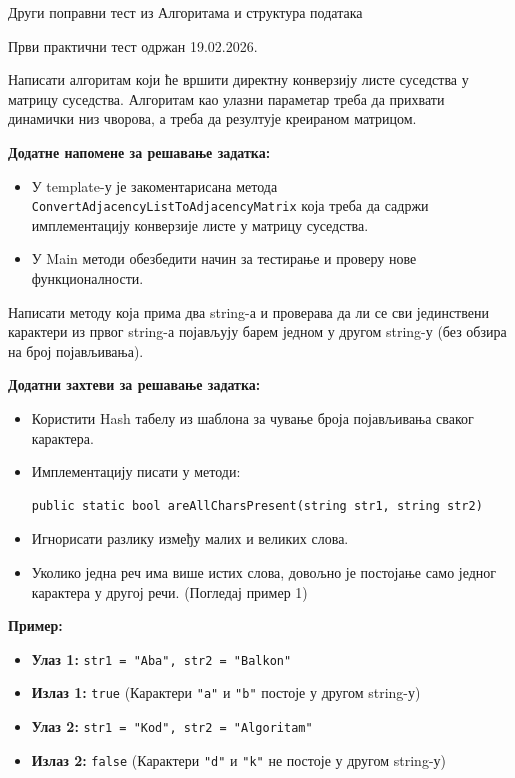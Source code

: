 
Други поправни тест из Алгоритама и структура података

Први практични тест одржан 19.02.2026.

Написати алгоритам који ће вршити директну конверзију листе суседства у матрицу суседства. Алгоритам као улазни параметар треба да прихвати динамички низ чворова, а треба да резултује креираном матрицом.

\textbf{Додатне напомене за решавање задатка:}
\begin{itemize}
	\item У template-у је закоментарисана метода \texttt{ConvertAdjacencyListToAdjacencyMatrix} која треба да садржи имплементацију конверзије листе у матрицу суседства.
	\item У Main методи обезбедити начин за тестирање и проверу нове функционалности.
\end{itemize}

Написати методу која прима два string-а и проверава да ли се сви јединствени карактери из првог string-а појављују барем једном у другом string-у (без обзира на број појављивања).

\textbf{Додатни захтеви за решавање задатка:}
\begin{itemize}
	\item Користити Hash табелу из шаблона за чување броја појављивања сваког карактера.
	\item Имплементацију писати у методи:
	\begin{Verbatim}[fontsize=\small]
public static bool areAllCharsPresent(string str1, string str2)
	\end{Verbatim}
	\item Игнорисати разлику између малих и великих слова.
	\item Уколико једна реч има више истих слова, довољно је постојање само једног карактера у другој речи. (Погледај пример 1)
\end{itemize}

\textbf{Пример:}
\begin{itemize}
	\item \textbf{Улаз 1:} \texttt{str1 = "Aba", str2 = "Balkon"}
	\item \textbf{Излаз 1:} \texttt{true} (Карактери \texttt{"a"} и \texttt{"b"} постоје у другом string-у)
	\item \textbf{Улаз 2:} \texttt{str1 = "Kod", str2 = "Algoritam"}
	\item \textbf{Излаз 2:} \texttt{false} (Карактери \texttt{"d"} и \texttt{"k"} не постоје у другом string-у)
\end{itemize}


